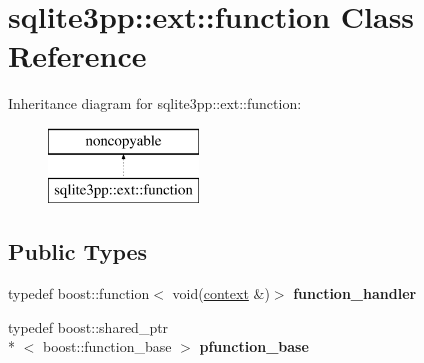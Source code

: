 \hypertarget{classsqlite3pp_1_1ext_1_1function}{\section{sqlite3pp\-:\-:ext\-:\-:function Class Reference}
\label{classsqlite3pp_1_1ext_1_1function}
}
Inheritance diagram for sqlite3pp\-:\-:ext\-:\-:function\-:\begin{figure}[H]
\begin{center}
\leavevmode
\includegraphics[height=2.000000cm]{classsqlite3pp_1_1ext_1_1function}
\end{center}
\end{figure}
\subsection*{Public Types}
\begin{DoxyCompactItemize}
\item 
\hypertarget{classsqlite3pp_1_1ext_1_1function_a2bcae882e1f5154bc37e8bea893a7442}{typedef boost\-::function$<$ void(\hyperlink{classsqlite3pp_1_1ext_1_1context}{context} \&)$>$ {\bfseries function\-\_\-handler}}\label{classsqlite3pp_1_1ext_1_1function_a2bcae882e1f5154bc37e8bea893a7442}

\item 
\hypertarget{classsqlite3pp_1_1ext_1_1function_a0518a4144a7080bbf79ec7c84dfebcb1}{typedef boost\-::shared\-\_\-ptr\\*
$<$ boost\-::function\-\_\-base $>$ {\bfseries pfunction\-\_\-base}}\label{classsqlite3pp_1_1ext_1_1function_a0518a4144a7080bbf79ec7c84dfebcb1}

\end{DoxyCompactItemize}
